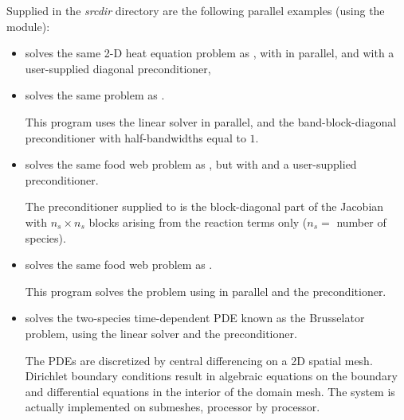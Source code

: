 
\vspace{0.2in}\noindent 
Supplied in the {\em srcdir} directory are
the following parallel examples (using the {\nvecp} module):

\begin{itemize}


\item {}
  solves the same 2-D heat equation problem as , with {\idaspgmr}
  in parallel, and with a user-supplied diagonal preconditioner,
  
\item {}
  solves the same problem as .

  This program uses the {\idaspgmr} linear solver in parallel,
  and the band-block-diagonal preconditioner {\idabbdpre} with half-bandwidths 
  equal to $1$.

\item {}
  solves the same food web problem as , but with {\idaspgmr}
  and a user-supplied preconditioner.
  
  The preconditioner supplied to {\idaspgmr} is the block-diagonal part of 
  the Jacobian with $n_s \times n_s$ blocks arising from the reaction terms only
  ($n_s =$ number of species).

\item {}
  solves the same food web problem as .

  This program solves the problem using {\idaspgmr} in parallel and the
  {\idabbdpre} preconditioner.

\item {}
  solves the two-species time-dependent PDE known as the Brusselator problem,
  using the {\idaspgmr} linear solver and the {\idabbdpre} preconditioner.

  The PDEs are discretized by central differencing on a 2D spatial mesh.
  Dirichlet boundary conditions result in  algebraic equations on the boundary 
  and differential equations in the interior of the domain mesh.
  The system is actually implemented on submeshes, processor by
  processor.



\end{itemize}
